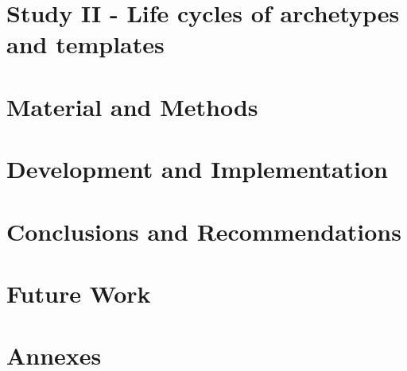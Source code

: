 \documentclass[a4paper, twoside, openright]{report}
\begin{document}
\chapter{Study II - Life cycles of archetypes and templates}


\chapter{Material and Methods}


\chapter{Development and Implementation}











\chapter{Conclusions and Recommendations}


\chapter{Future Work}





\chapter{Annexes}


\backCover{}
\end{document}
